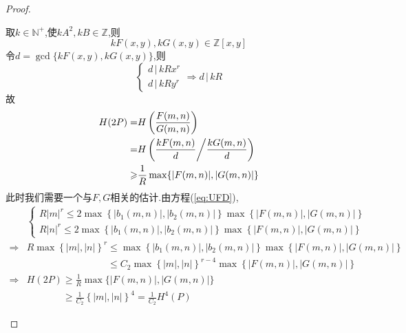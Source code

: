 \documentclass[12pt,A4paper,oneside,reqno]{amsart}
\numberwithin{equation}{section}
\theoremstyle{definition}
\theoremstyle{plain}
\theoremstyle{plain}
\numberwithin{equation}{section}
\theoremstyle{remark}
\begin{document}
\begin{proof}
\begin{enumerate}[1.]
		取$k \in \mathbb{N}^+$,使$kA^2,kB \in \mathbb{Z}$,则
		$$kF(x,y),kG(x,y) \in \mathbb{Z}[x,y]$$
		令$d=\gcd \{kF(x,y),kG(x,y)\}$,则
		$$\begin{cases}
		d\,|\,kRx^r\\
		d\,|\,kRy^r
		\end{cases} \Rightarrow d\,|\,kR$$
		故
		\begin{equation*}
		\begin{aligned}
		H(2P)=&H\left(\frac{F(m,n)}{G(m,n)}\right)\\
		=&H\left(\frac{kF(m,n)}{d} \middle/\frac{kG(m,n)}{d} \right)\\
		\geqslant &\frac{1}{R} \max \{|F(m,n)|,|G(m,n)|\}
		\end{aligned}
		\end{equation*}
		此时我们需要一个与$F,G$相关的估计.由方程(\ref{eq:UFD}),
		\begin{equation*}
		\begin{aligned}
			& \begin{cases}
			R|m|^r \leqslant 2\max \left\{|b_1(m,n)|,|b_2(m,n)|\right\}\max  \left\{|F(m,n)|,|G(m,n)|\right\}\\
			R|n|^r \leqslant 2\max \left\{|b_1(m,n)|,|b_2(m,n)|\right\}\max  \left\{|F(m,n)|,|G(m,n)|\right\}
			\end{cases}\\
			\Longrightarrow& 
			R\max\left\{|m|,|n|\right\}^r \leqslant \max \left\{|b_1(m,n)|,|b_2(m,n)|\right\}\max  \left\{|F(m,n)|,|G(m,n)|\right\}\\
			\phantom{\Longrightarrow}&\phantom{R\max\left\{|m|,|n|\right\}^r} \leqslant C_2\max \left\{|m|,|n|\right\}^{r-4}\max  \left\{|F(m,n)|,|G(m,n)|\right\}\\
			\Longrightarrow& H(2P)\geqslant \frac{1}{R} \max \{|F(m,n)|,|G(m,n)|\}\\
			\phantom{\Longrightarrow}&\phantom{H(2P)}\geqslant \frac{1}{C_2} \left\{|m|,|n|\right\}^{4}=\frac{1}{C_2}H^4(P)
		\end{aligned}
		\end{equation*}
	\end{enumerate}
\end{proof}
\end{document}
